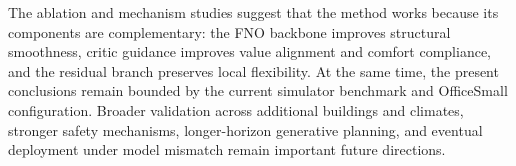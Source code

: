 \documentclass[lettersize,journal]{IEEEtran}
\theoremstyle{nonumberplain}     \theoremheaderfont{\bfseries\itshape}     \theorembodyfont{\normalfont}     \theoremseparator{:}     \theoremsymbol{\ensuremath{\blacksquare}}     \newtheorem{proof}{Proof}
\theoremstyle{plain}     \theoremheaderfont{\bfseries\itshape}     \theorembodyfont{\normalfont}     \theoremseparator{:}     \theoremsymbol{\ensuremath{\blacksquare}}     \newtheorem{remark}{Remark}
\begin{document}
The ablation and mechanism studies suggest that the method works because its components are complementary: the FNO backbone improves structural smoothness, critic guidance improves value alignment and comfort compliance, and the residual branch preserves local flexibility. At the same time, the present conclusions remain bounded by the current simulator benchmark and OfficeSmall configuration. Broader validation across additional buildings and climates, stronger safety mechanisms, longer-horizon generative planning, and eventual deployment under model mismatch remain important future directions.


\end{document}
